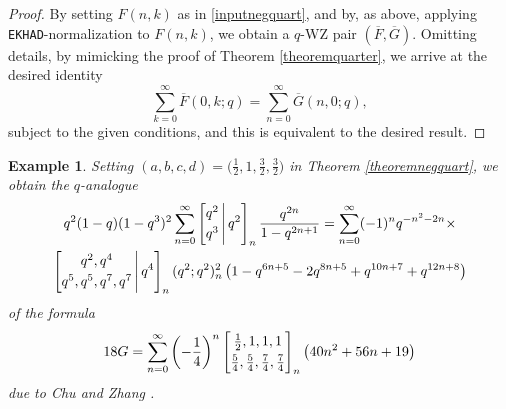 \documentclass[12pt]{article}
\newtheorem{example}{Example}
\begin{document}
\begin{proof}
 By setting $F(n, k)$ as in \eqref{inputnegquart},   and by, as above, applying {\tt EKHAD}-normalization to $F(n, k)$, 
 we obtain a $q$-WZ pair 
 $(\overline{F}, \overline{G})$. Omitting details, 
 by mimicking the proof of 
 Theorem \ref{theoremquarter}, 
 we arrive at the desired identity 
 $$ \sum_{k=0}^{\infty} \overline{F}(0, k;q) = \sum_{n=0}^{\infty} \overline{G}(n,0;q), $$
 subject to the given conditions, 
 and this is equivalent to the desired result. 
\end{proof}

\begin{example}
 Setting $(a, b, c, d) = \big( \frac{1}{2}, 1, \frac{3}{2}, \frac{3}{2} \big)$ in Theorem \ref{theoremnegquart}, we obtain 
 the $q$-analogue 
\begin{multline*}
 q^2 (1-q) (1-q^3)^{2} 
 \sum_{n=0}^{\infty} 
 \left[ \begin{matrix} 
 q^2 \vspace{1mm} \\ 
 q^3 \end{matrix} \, \Bigg| \, q^2 \right]_{n} 
 \frac{q^{2n}}{1 - q^{2n+1}} = 
 \sum_{n=0}^{\infty} (-1)^{n} 
 q^{-n^2-2n} \times \\ 
 \left[ \begin{matrix} 
 q^2, q^4 \vspace{1mm} \\ 
 q^5, q^5, q^7, q^7 \end{matrix} \, \Bigg| \, q^4 \right]_{n} (q^2;q^2)_{n}^{2} \, 
 \big( 1 - q^{6 n+5} - 2 q^{8 n+5}+q^{10 n+7}+q^{12 n+8} \big) 
\end{multline*}
 of the formula 
\begin{equation*}
 18 G = 
 \sum_{n = 0}^{\infty} 
 \left( -\frac{1}{4} \right)^{n} \left[ \begin{matrix} 
 \frac{1}{2}, 1, 1, 1 
 \vspace{1mm} \\ 
 \frac{5}{4}, \frac{5}{4}, \frac{7}{4}, \frac{7}{4} 
 \end{matrix} \right]_{n} \big( 40	 n^2 + 56n + 19 \big) 
 \end{equation*}
 due to Chu and Zhang \cite[Example 85]{ChuZhang2014}. 
\end{example}
\end{document}
